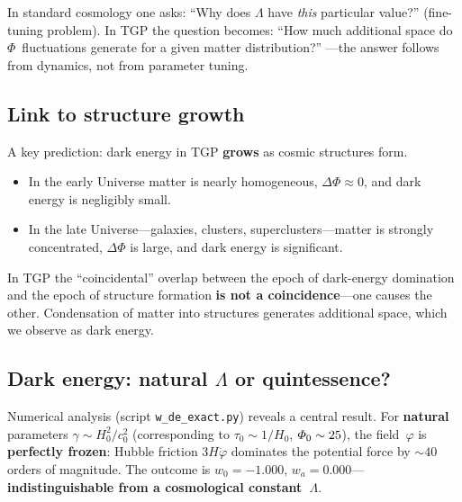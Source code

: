 \begin{remark}
In standard cosmology one asks: ``Why does $\Lambda$ have
\emph{this} particular value?'' (fine-tuning problem).
In TGP the question becomes: ``How much additional space do
$\Phi$~fluctuations generate for a given matter distribution?''
---the answer follows from dynamics, not from parameter tuning.
\end{remark}

\subsection{Link to structure growth}\label{ssec:de-struktury}

A key prediction: dark energy in TGP \textbf{grows} as cosmic
structures form.
\begin{itemize}[nosep]
  \item In the early Universe matter is nearly homogeneous,
        $\Delta\Phi \approx 0$, and dark energy is negligibly small.
  \item In the late Universe---galaxies, clusters,
        superclusters---matter is strongly concentrated,
        $\Delta\Phi$ is large, and dark energy is significant.
\end{itemize}

\begin{hypothesis}\label{hyp:coincidence}
In TGP the ``coincidental'' overlap between the epoch of
dark-energy domination and the epoch of structure formation
\textbf{is not a coincidence}---one causes the other.
Condensation of matter into structures generates additional
space, which we observe as dark energy.
\end{hypothesis}

\subsection{Dark energy: natural $\Lambda$ or quintessence?}%
\label{ssec:de-dyn}

Numerical analysis (script \texttt{w\_de\_exact.py}) reveals
a central result.  For \textbf{natural} parameters
$\gamma \sim H_0^2/c_0^2$ (corresponding to
$\tau_0 \sim 1/H_0$, $\varPhi_0 \sim 25$), the field~$\varphi$
is \textbf{perfectly frozen}: Hubble friction $3H\dot\varphi$
dominates the potential force by $\sim 40$ orders of magnitude.
The outcome is $w_0 = -1.000$, $w_a = 0.000$---\textbf{indistinguishable
from a cosmological constant~$\Lambda$}.

